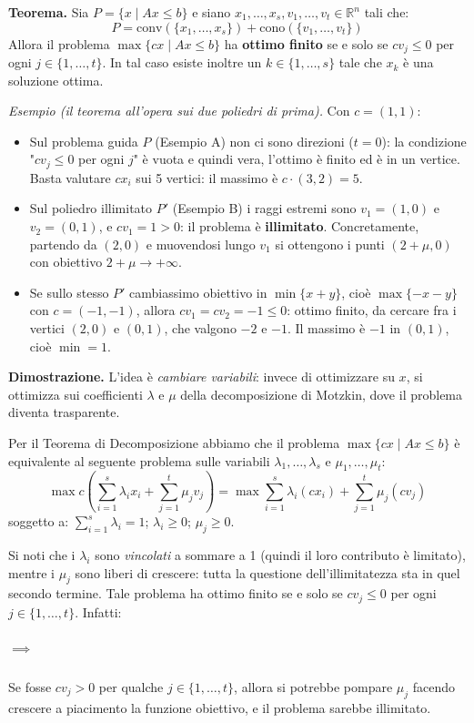 \documentclass[12pt]{extarticle} %
\begin{document}
\noindent\textbf{Teorema.} Sia $P=\{x \mid Ax \le b\}$ e siano $x_1, \dots, x_s, v_1, \dots, v_t \in \mathbb{R}^n$ tali che:
\[ P = \text{conv}(\{x_1, \dots, x_s\}) + \text{cono}(\{v_1, \dots, v_t\}) \]
Allora il problema $\max\{cx \mid Ax \le b\}$ ha \textbf{ottimo finito} se e solo se $cv_j \le 0$ per ogni $j \in \{1, \dots, t\}$.
In tal caso esiste inoltre un $k \in \{1, \dots, s\}$ tale che $x_k$ è una soluzione ottima.

\noindent\textit{Esempio (il teorema all'opera sui due poliedri di prima).} Con $c=(1,1)$:
\begin{itemize}
    \item Sul problema guida $P$ (Esempio A) non ci sono direzioni ($t=0$): la condizione "$cv_j\le0$ per ogni $j$" è vuota e quindi vera, l'ottimo è finito ed è in un vertice. Basta valutare $c x_i$ sui 5 vertici: il massimo è $c\cdot(3,2)=5$.
    \item Sul poliedro illimitato $P'$ (Esempio B) i raggi estremi sono $v_1=(1,0)$ e $v_2=(0,1)$, e $cv_1 = 1 > 0$: il problema è \textbf{illimitato}. Concretamente, partendo da $(2,0)$ e muovendosi lungo $v_1$ si ottengono i punti $(2+\mu,0)$ con obiettivo $2+\mu \to +\infty$.
    \item Se sullo stesso $P'$ cambiassimo obiettivo in $\min\{x+y\}$, cioè $\max\{-x-y\}$ con $c=(-1,-1)$, allora $cv_1=cv_2=-1\le0$: ottimo finito, da cercare fra i vertici $(2,0)$ e $(0,1)$, che valgono $-2$ e $-1$. Il massimo è $-1$ in $(0,1)$, cioè $\min = 1$.
\end{itemize}

\noindent\textbf{Dimostrazione.}
L'idea è \emph{cambiare variabili}: invece di ottimizzare su $x$, si ottimizza sui coefficienti $\lambda$ e $\mu$ della decomposizione di Motzkin, dove il problema diventa trasparente.

\noindent Per il Teorema di Decomposizione abbiamo che il problema $\max\{cx \mid Ax \le b\}$ è equivalente al seguente problema sulle variabili $\lambda_1, \dots, \lambda_s$ e $\mu_1, \dots, \mu_t$:
\[ \max c \left( \sum_{i=1}^s \lambda_i x_i + \sum_{j=1}^t \mu_j v_j \right) = \max \sum_{i=1}^s \lambda_i (cx_i) + \sum_{j=1}^t \mu_j (cv_j) \]
soggetto a: $\sum_{i=1}^s \lambda_i = 1$; $\lambda_i \ge 0$; $\mu_j \ge 0$.

\noindent Si noti che i $\lambda_i$ sono \emph{vincolati} a sommare a 1 (quindi il loro contributo è limitato), mentre i $\mu_j$ sono liberi di crescere: tutta la questione dell'illimitatezza sta in quel secondo termine. Tale problema ha ottimo finito se e solo se $cv_j \le 0$ per ogni $j \in \{1, \dots, t\}$. Infatti:
\subparagraph{$\implies$} Se fosse $cv_j > 0$ per qualche $j \in \{1, \dots, t\}$, allora si potrebbe pompare $\mu_j$ facendo crescere a piacimento la funzione obiettivo, e il problema sarebbe illimitato.
\end{document}
